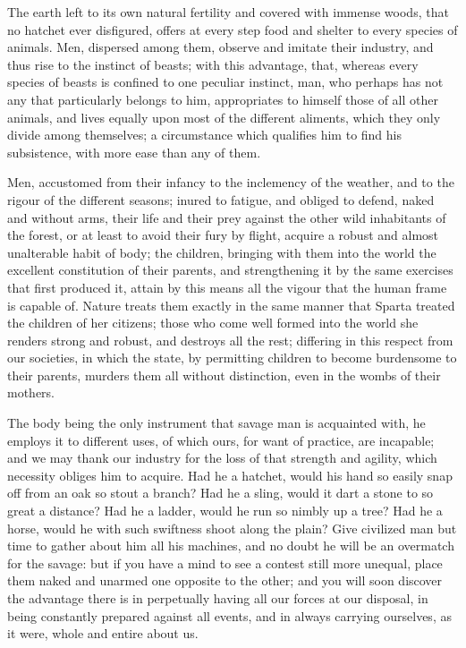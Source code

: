 \documentclass[11pt,twocolumn]{ltugboat}
\begin{document}
The earth left to its own natural fertility and covered with immense
woods, that no hatchet ever disfigured, offers at every step food and
shelter to every species of animals. Men, dispersed among them,
observe and imitate their industry, and thus rise to the instinct of
beasts; with this advantage, that, whereas every species of beasts is
confined to one peculiar instinct, man, who perhaps has not any that
particularly belongs to him, appropriates to himself those of all
other animals, and lives equally upon most of the different aliments,
which they only divide among themselves; a circumstance which
qualifies him to find his subsistence, with more ease than any of
them.

Men, accustomed from their infancy to the inclemency of the weather,
and to the rigour of the different seasons; inured to fatigue, and
obliged to defend, naked and without arms, their life and their prey
against the other wild inhabitants of the forest, or at least to avoid
their fury by flight, acquire a robust and almost unalterable habit of
body; the children, bringing with them into the world the excellent
constitution of their parents, and strengthening it by the same
exercises that first produced it, attain by this means all the vigour
that the human frame is capable of. Nature treats them exactly in the
same manner that Sparta treated the children of her citizens; those
who come well formed into the world she renders strong and robust, and
destroys all the rest; differing in this respect from our societies,
in which the state, by permitting children to become burdensome to
their parents, murders them all without distinction, even in the wombs
of their mothers.

The body being the only instrument that savage man is acquainted with,
he employs it to different uses, of which ours, for want of practice,
are incapable; and we may thank our industry for the loss of that
strength and agility, which necessity obliges him to acquire. Had he a
hatchet, would his hand so easily snap off from an oak so stout a
branch? Had he a sling, would it dart a stone to so great a distance?
Had he a ladder, would he run so nimbly up a tree? Had he a horse,
would he with such swiftness shoot along the plain? Give civilized man
but time to gather about him all his machines, and no doubt he will be
an overmatch for the savage: but if you have a mind to see a contest
still more unequal, place them naked and unarmed one opposite to the
other; and you will soon discover the advantage there is in
perpetually having all our forces at our disposal, in being constantly
prepared against all events, and in always carrying ourselves, as it
were, whole and entire about us.
\end{document}
